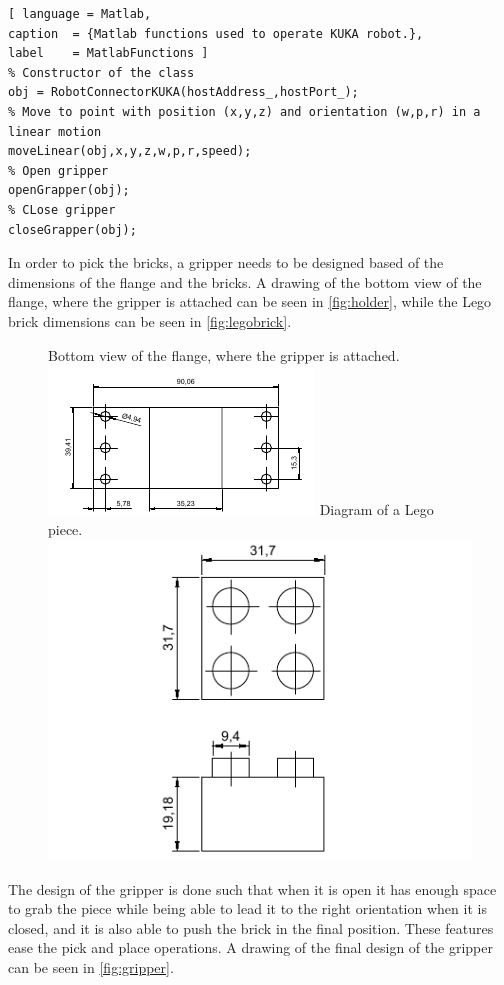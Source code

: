 \begin{lstlisting}[ language = Matlab,
caption  = {Matlab functions used to operate KUKA robot.},
label    = MatlabFunctions ]
% Constructor of the class
obj = RobotConnectorKUKA(hostAddress_,hostPort_);
% Move to point with position (x,y,z) and orientation (w,p,r) in a linear motion
moveLinear(obj,x,y,z,w,p,r,speed);
% Open gripper
openGrapper(obj);
% CLose gripper
closeGrapper(obj);
\end{lstlisting}

In order to pick the bricks, a gripper needs to be designed based of the dimensions of the flange and the bricks. A drawing of the bottom view of the flange, where the gripper is attached can be seen in \autoref{fig:holder}, while the Lego brick dimensions can be seen in \autoref{fig:legobrick}.

\begin{figure}[H]
    \captionbox
    {
        Bottom view of the flange, where the gripper is attached.
        \label{fig:holder}                                 
    }                                                                 
    {                                                                  
        \includegraphics[width=.4\textwidth]{figures/holder}         
    }                                                                   
    \hspace{5pt}
    \captionbox
    {
        Diagram of a Lego piece.
        \label{fig:legobrick}                                     
    }                                                                           
    {                                                                            
        \includegraphics[width=.4\textwidth]{figures/LegoPiece}            
    }                                                                            
\end{figure}
The design of the gripper is done such that when it is open it has enough space to grab the piece while being able to lead it to the right orientation when it is closed, and it is also able to push the brick in the final position. These features ease the pick and place operations. A drawing of the final design of the gripper can be seen in \autoref{fig:gripper}.

